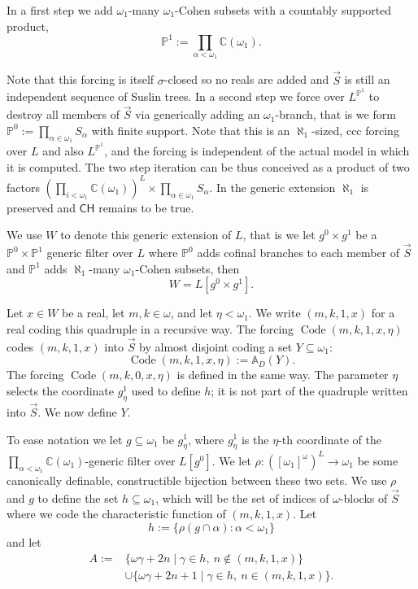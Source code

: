 \documentclass[a4paper,11pt]{article}
\newcommand{\forceP}{\mathbb{P}}
\newcommand{\CH}{\mathsf{CH}}
\begin{document}
    In a first step we add $\omega_1$-many $\omega_1$-Cohen subsets with a countably supported product, $$\forceP^1:= \prod_{\alpha< \omega_1} \mathbb{C} (\omega_1).$$
    
    Note that this forcing is itself $\sigma$-closed so no reals are added and $\vec{S}$ is still an independent sequence of Suslin trees. In a second step we force over $L^{\forceP^1}$ to destroy all members of $\vec{S}$ via generically adding an $\omega_1$-branch, that is we  form $\forceP^0:=\prod_{\alpha \in \omega_1} S_{\alpha}$ with finite support. Note that this is an $\aleph_1$-sized, ccc forcing over $L$ and also $L^{\forceP^1}$, and the forcing is independent of the actual model in which it is computed. The two step iteration can be thus conceived as a product of two factors $(\prod_{i < \omega_1} \mathbb{C} (\omega_1))^L \times \prod_{\alpha \in \omega_1} S_{\alpha}$.  In the generic extension $\aleph_1$ is preserved and $\CH$ remains to be true.  
   
     We use $W$ to denote this generic extension of $L$, that is we let $g^0 \times g^1$ be a $\forceP^0 \times \forceP^1$ generic filter over $L$  where $\forceP^0$ adds cofinal branches to each member of $\vec{S}$ and $\forceP^1$ adds $\aleph_1$-many $\omega_1$-Cohen subsets, then \[W=L[g^0 \times g^1].\]

   
     Let $x \in W$ be a real, let $m,k \in \omega$, and let $\eta<\omega_1$. We write $(m,k,1,x)$ for a real coding this quadruple in a recursive way. The forcing $\operatorname{Code}(m,k,1,x,\eta)$ codes $(m,k,1,x)$ into $\vec{S}$ by almost disjoint coding a set $Y\subseteq\omega_1$:
     \[
     \operatorname{Code}(m,k,1,x,\eta):=\mathbb A_D(Y).
     \]
     The forcing $\operatorname{Code}(m,k,0,x,\eta)$ is defined in the same way. The parameter $\eta$ selects the coordinate $g^1_\eta$ used to define $h$; it is not part of the quadruple written into $\vec S$. We now define $Y$.

     To ease notation we let $g\subseteq\omega_1$ be $g^1_\eta$, where $g^1_\eta$ is the $\eta$-th coordinate of the $\prod_{\alpha<\omega_1}\mathbb C(\omega_1)$-generic filter over $L[g^0]$. We let $\rho:([\omega_1]^\omega)^L\to\omega_1$ be some canonically definable, constructible bijection between these two sets. We use $\rho$ and $g$ to define the set $h\subseteq\omega_1$, which will be the set of indices of $\omega$-blocks of $\vec S$ where we code the characteristic function of $(m,k,1,x)$. Let
     \[
     h:=\{\rho(g\cap\alpha):\alpha<\omega_1\}
     \]
     and let
     \begin{align*}
     A:=&\{\omega\gamma+2n\mid\gamma\in h,\ n\notin(m,k,1,x)\}\\
       &\cup\{\omega\gamma+2n+1\mid\gamma\in h,\ n\in(m,k,1,x)\}.
     \end{align*}
\end{document}
